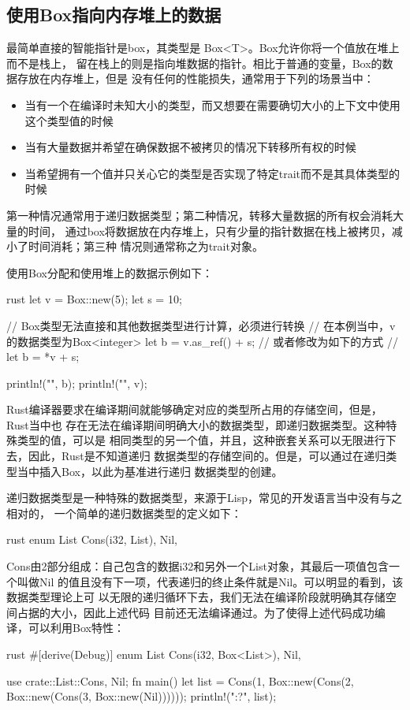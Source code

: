 \subsection{使用Box指向内存堆上的数据}
最简单直接的智能指针是box，其类型是 Box<T>。Box允许你将一个值放在堆上而不是栈上，
留在栈上的则是指向堆数据的指针。相比于普通的变量，Box的数据存放在内存堆上，但是
没有任何的性能损失，通常用于下列的场景当中：
\begin{itemize}
\item 当有一个在编译时未知大小的类型，而又想要在需要确切大小的上下文中使用这个类型值的时候
\item 当有大量数据并希望在确保数据不被拷贝的情况下转移所有权的时候
\item 当希望拥有一个值并只关心它的类型是否实现了特定trait而不是其具体类型的时候
\end{itemize}

第一种情况通常用于递归数据类型；第二种情况，转移大量数据的所有权会消耗大量的时间，
通过box将数据放在内存堆上，只有少量的指针数据在栈上被拷贝，减小了时间消耗；第三种
情况则通常称之为trait对象。

使用Box分配和使用堆上的数据示例如下：
\begin{code-block}{rust}
let v = Box::new(5);
let s = 10;

// Box类型无法直接和其他数据类型进行计算，必须进行转换
// 在本例当中，v的数据类型为Box<{integer}>
let b = v.as_ref() + s;
// 或者修改为如下的方式
// let b = *v + s;

println!("{}", b);
println!("{}", v);
\end{code-block}

Rust编译器要求在编译期间就能够确定对应的类型所占用的存储空间，但是，Rust当中也
存在无法在编译期间明确大小的数据类型，即递归数据类型。这种特殊类型的值，可以是
相同类型的另一个值，并且，这种嵌套关系可以无限进行下去，因此，Rust是不知道递归
数据类型的存储空间的。但是，可以通过在递归类型当中插入Box，以此为基准进行递归
数据类型的创建。

递归数据类型是一种特殊的数据类型，来源于Lisp，常见的开发语言当中没有与之相对的，
一个简单的递归数据类型的定义如下：
\begin{code-block}{rust}
enum List {
    Cons(i32, List),
    Nil,
}
\end{code-block}
Cons由2部分组成：自己包含的数据i32和另外一个List对象，其最后一项值包含一个叫做Nil
的值且没有下一项，代表递归的终止条件就是Nil。可以明显的看到，该数据类型理论上可
以无限的递归循环下去，我们无法在编译阶段就明确其存储空间占据的大小，因此上述代码
目前还无法编译通过。为了使得上述代码成功编译，可以利用Box特性：
\begin{code-block}{rust}
#[derive(Debug)]
enum List {
    Cons(i32, Box<List>),
    Nil,
}

use crate::List::{Cons, Nil};
fn main() {
    let list = Cons(1, Box::new(Cons(2, Box::new(Cons(3, Box::new(Nil))))));
    println!("{:?}", list);
}
\end{code-block}

